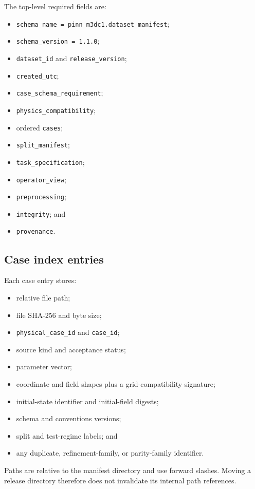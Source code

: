 \documentclass[11pt]{article}
\newcommand{\code}[1]{\texttt{#1}}
\begin{document}
The top-level required fields are:
\begin{itemize}
  \item \code{schema\_name = pinn\_m3dc1.dataset\_manifest};
  \item \code{schema\_version = 1.1.0};
  \item \code{dataset\_id} and \code{release\_version};
  \item \code{created\_utc};
  \item \code{case\_schema\_requirement};
  \item \code{physics\_compatibility};
  \item ordered \code{cases};
  \item \code{split\_manifest};
  \item \code{task\_specification};
  \item \code{operator\_view};
  \item \code{preprocessing};
  \item \code{integrity}; and
  \item \code{provenance}.
\end{itemize}

\subsection{Case index entries}

Each case entry stores:
\begin{itemize}
  \item relative file path;
  \item file SHA-256 and byte size;
  \item \code{physical\_case\_id} and \code{case\_id};
  \item source kind and acceptance status;
  \item parameter vector;
  \item coordinate and field shapes plus a grid-compatibility signature;
  \item initial-state identifier and initial-field digests;
  \item schema and conventions versions;
  \item split and test-regime labels; and
  \item any duplicate, refinement-family, or parity-family identifier.
\end{itemize}

Paths are relative to the manifest directory and use forward slashes. Moving a release directory therefore does not invalidate its internal path references.
\end{document}
